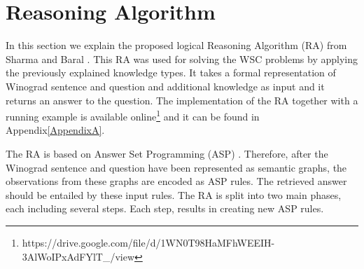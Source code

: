 \section{Reasoning Algorithm}
In this section we explain the proposed logical Reasoning Algorithm (RA) from Sharma and Baral \cite{2018CommonsenseKT}. This RA was used for solving the WSC problems by applying the previously explained knowledge types. It takes a formal representation of Winograd sentence and question and additional knowledge as input and it returns an answer to the question. The implementation of the RA together with a running example is available online\footnote{https://drive.google.com/file/d/1WN0T98HaMFhWEEIH-3AlWoIPxAdFYlT\_/view} and it can be found in Appendix\ref{AppendixA}. 

The RA is based on Answer Set Programming (ASP) \cite{DBLP:conf/aaai/Lifschitz08}. Therefore, after the Winograd sentence and question have been represented as semantic graphs, the observations from these graphs are encoded as ASP rules. The retrieved answer should be entailed by these input rules.
The RA is split into two main phases, each including several steps. Each step, results in creating new ASP rules.
